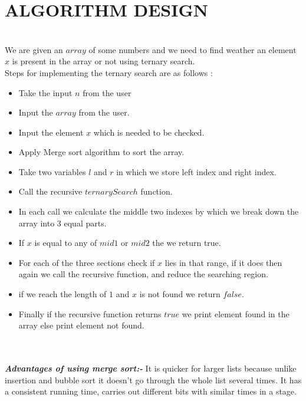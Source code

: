 \documentclass[conference]{IEEEtran}
\begin{document}
\section{ALGORITHM DESIGN}\\
We are given an $array$ of some numbers and we need to find weather an element $x$  is present in the array or not using ternary search.
\\Steps for implementing the ternary search are as follows :
\begin{itemize}
\item Take the input $n$ from the user
\item Input the $array$ from the user.
\item Input the element $x$ which is needed to be checked.
\item Apply Merge sort algorithm to sort the array.
\item Take two variables $l$ and $r$ in which we store left index and right index.
\item Call the recursive $ternarySearch$ function.
\item In each call we calculate the middle two indexes by which we break down the array into $3$ equal parts.
\item If $x$ is equal to any of $mid1$ or $mid 2$ the we return true.
\item For each of the three sections check if $x$ lies in that range, if it does then again we call the recursive function, and reduce the searching region.
\item if we reach the length of $1$ and $x$ is not found we return $false$.
\item Finally if the recursive function returns $true$ we print element found in the array else print element not found.

\end{itemize}

\\\\\textbf{\textit{Advantages of using merge sort:- }}
 It is quicker for larger lists because unlike 
insertion and bubble sort it doesn't go through the 
whole list several times. 
It has a consistent running time, carries out 
different bits with similar  times in a stage. 
\end{document}
